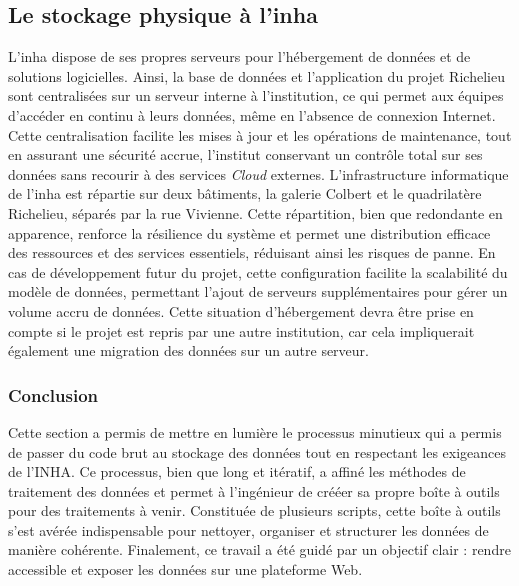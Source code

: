 \subsection{Le stockage physique à l'\acrshort{inha}}
L'\acrshort{inha} dispose de ses propres serveurs pour l'hébergement de données et de solutions logicielles. Ainsi, la base de données et l'application du projet Richelieu sont centralisées sur un serveur interne à l'institution, ce qui permet aux équipes d'accéder en continu à leurs données, même en l'absence de connexion Internet. Cette centralisation facilite les mises à jour et les opérations de maintenance, tout en assurant une sécurité accrue, l'institut conservant un contrôle total sur ses données sans recourir à des services \textit{Cloud} externes. L'infrastructure informatique de l'\acrshort{inha} est répartie sur deux bâtiments, la galerie Colbert et le quadrilatère Richelieu, séparés par la rue Vivienne. Cette répartition, bien que redondante en apparence, renforce la résilience du système et permet une distribution efficace des ressources et des services essentiels, réduisant ainsi les risques de panne. En cas de développement futur du projet, cette configuration facilite la scalabilité du modèle de données, permettant l'ajout de serveurs supplémentaires pour gérer un volume accru de données. Cette situation d'hébergement devra être prise en compte si le projet est repris par une autre institution, car cela impliquerait également une migration des données sur un autre serveur. 

\subsubsection{Conclusion}
Cette section a permis de mettre en lumière le processus minutieux qui a permis de passer du code brut au stockage des données tout en respectant les exigeances de l'INHA. Ce processus, bien que long et itératif, a affiné les méthodes de traitement des données et permet à l'ingénieur de crééer sa propre boîte à outils pour des traitements à venir. Constituée de plusieurs scripts, cette boîte à outils s'est avérée indispensable pour nettoyer, organiser et structurer les données de manière cohérente. Finalement, ce travail a été guidé par un objectif clair : rendre accessible et exposer les données sur une plateforme Web. 

